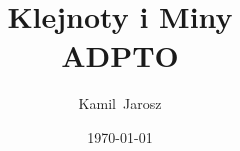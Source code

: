 \title{Klejnoty i Miny\\\Large ADPTO}
\author{Kamil~Jarosz}
\date{\today}
\maketitle
\vspace{2cm}
\cleardoublepage
